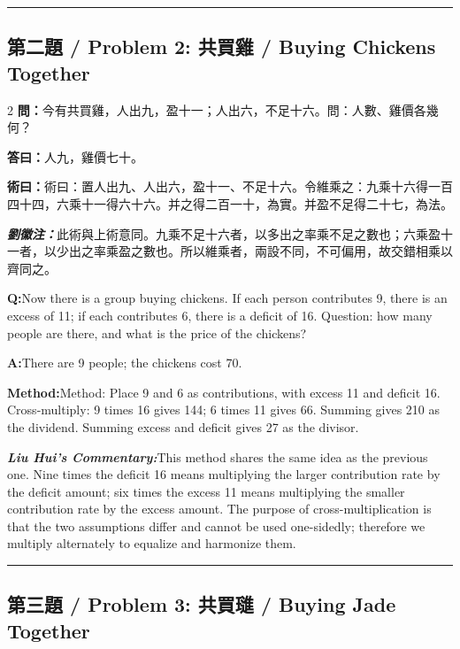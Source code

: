 \documentclass[11pt,a4paper]{article}
\newcommand{\cnwen}{\textcolor{cnlabelfg}{\textbf{問：}}}
\newcommand{\cnda}{\textbf{答曰：}}
\newcommand{\cnshu}{\textcolor{cnlabelfg}{\textbf{術曰：}}}
\newcommand{\cnzhu}{\textcolor{commentarycolor}{\textit{\textbf{劉徽注：}}}}
\newcommand{\enwen}{\textcolor{enlabelfg}{\textbf{Q:}}}
\newcommand{\enda}{\textcolor{enlabelfg}{\textbf{A:}}}
\newcommand{\enshu}{\textcolor{enlabelfg}{\textbf{Method:}}}
\newcommand{\enzhu}{\textcolor{enlabelfg}{\textit{\textbf{Liu Hui's Commentary:}}}}
\begin{document}
\bigskip\hrule\bigskip

\subsection{第二題 / Problem 2: 共買雞 / Buying Chickens Together}

\begin{paracol}{2}
\switchcolumn[0]
\cnwen 今有共買雞，人出九，盈十一；人出六，不足十六。問：人數、雞價各幾何？

\cnda 人九，雞價七十。

\cnshu 術曰：置人出九、人出六，盈十一、不足十六。令維乘之：九乘十六得一百四十四，六乘十一得六十六。并之得二百一十，為實。并盈不足得二十七，為法。

\cnzhu 此術與上術意同。九乘不足十六者，以多出之率乘不足之數也；六乘盈十一者，以少出之率乘盈之數也。所以維乘者，兩設不同，不可偏用，故交錯相乘以齊同之。

\switchcolumn[1]
\enwen Now there is a group buying chickens. If each person contributes 9, there is an excess of 11; if each contributes 6, there is a deficit of 16. Question: how many people are there, and what is the price of the chickens?

\enda There are 9 people; the chickens cost 70.

\enshu Method: Place 9 and 6 as contributions, with excess 11 and deficit 16. Cross-multiply: 9 times 16 gives 144; 6 times 11 gives 66. Summing gives 210 as the dividend. Summing excess and deficit gives 27 as the divisor.

\enzhu This method shares the same idea as the previous one. Nine times the deficit 16 means multiplying the larger contribution rate by the deficit amount; six times the excess 11 means multiplying the smaller contribution rate by the excess amount. The purpose of cross-multiplication is that the two assumptions differ and cannot be used one-sidedly; therefore we multiply alternately to equalize and harmonize them.
\end{paracol}

\bigskip\hrule\bigskip

\subsection{第三題 / Problem 3: 共買璡 / Buying Jade Together}
\end{document}
